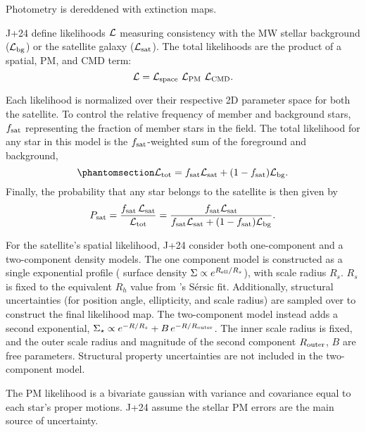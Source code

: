 Photometry is dereddened with \citet{schlegel+finkbeiner+davis1998}
extinction maps.

J+24 define likelihoods \({\cal L}\) measuring consistency with the MW
stellar background (\({\cal L}_{\rm bg}\)) or the satellite galaxy
(\({\cal L}_{\rm sat}\)). The total likelihoods are the product of a
spatial, PM, and CMD term: \begin{equation}{
{\cal L} = {\cal L}_{\rm space}\ {\cal L}_{\rm PM}\ {\cal L}_{\rm CMD}.
}\end{equation}

Each likelihood is normalized over their respective 2D parameter space
for both the satellite. To control the relative frequency of member and
background stars, \(f_{\rm sat}\) representing the fraction of member
stars in the field. The total likelihood for any star in this model is
the \(f_{\rm sat}\)-weighted sum of the foreground and background,
\begin{equation}\protect\phantomsection\label{eq:Ltot}{
{\cal L}_{\rm tot} = f_{\rm sat}{\cal L}_{\rm sat} + (1-f_{\rm sat}){\cal L}_{\rm bg}.
}\end{equation} Finally, the probability that any star belongs to the
satellite is then given by \begin{equation}{
P_{\rm sat} = 
\frac{f_{\rm sat}\,{\cal L}_{\rm sat}}{{\cal L}_{\rm tot}}
= \frac{f_{\rm sat}{\cal L}_{\rm sat}}{f_{\rm sat}{\cal L}_{\rm sat} + (1-f_{\rm sat}){\cal L}_{\rm bg}}.
}\end{equation}

For the satellite's spatial likelihood, J+24 consider both one-component
and a two-component density models. The one component model is
constructed as a single exponential profile ( surface density
\(\Sigma \propto e^{R_{\rm ell} / R_s}\)), with scale radius \(R_s\).
\(R_s\) is fixed to the equivalent \(R_h\) value from
\citet{munoz+2018}'s Sérsic fit. Additionally, structural uncertainties
(for position angle, ellipticity, and scale radius) are sampled over to
construct the final likelihood map. The two-component model instead adds
a second exponential,
\(\Sigma_\star \propto e^{-R/R_s} + B\,e^{-R/R_{\rm outer}}\). The inner
scale radius is fixed, and the outer scale radius and magnitude of the
second component \(R_{\rm outer}\), \(B\) are free parameters.
Structural property uncertainties are not included in the two-component
model.

The PM likelihood is a bivariate gaussian with variance and covariance
equal to each star's proper motions. J+24 assume the stellar PM errors
are the main source of uncertainty.


